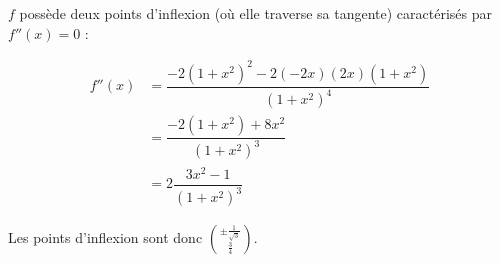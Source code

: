 \documentclass{report}
\begin{document}
$f$ possède deux points d'inflexion (où elle traverse sa tangente) caractérisés par $f''(x)=0$ :

\begin{equation*}
	\begin{split}
		f''(x) &= \dfrac{-2(1+x^2)^2-2(-2x)(2x)(1+x^2)}{(1+x^2)^4} \\
		       &= \dfrac{-2(1+x^2)+8x^2}{(1+x^2)^3} \\
		       &= 2\dfrac{3x^2-1}{(1+x^2)^3} 
	\end{split}
\end{equation*}

Les points d'inflexion sont donc $\binom{\pm\frac{1}{\sqrt{3}}}{\frac{3}{4}}$.

\end{document}
